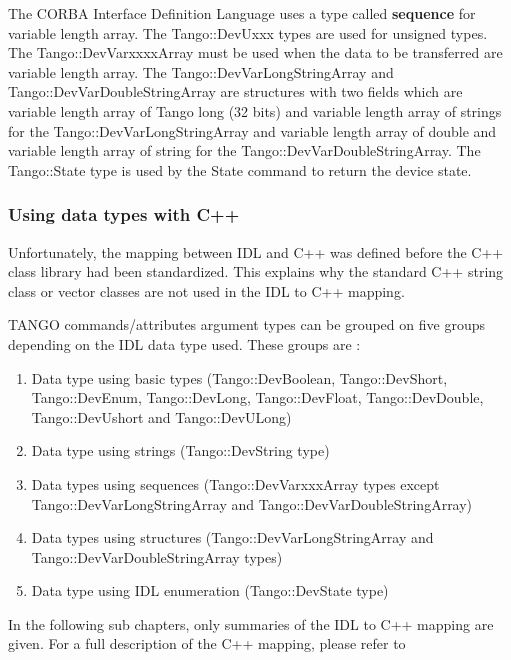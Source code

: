 \vspace{0.3cm}


The CORBA Interface Definition Language uses a type called \textbf{sequence}
for variable length array. The Tango::DevUxxx types are used for unsigned
types. The Tango::DevVarxxxxArray must be used when the data to be
transferred are variable length array. The Tango::DevVarLongStringArray
and Tango::DevVarDoubleStringArray
are structures with two fields which are variable length array of
Tango long (32 bits) and variable length array of strings for the
Tango::DevVarLongStringArray and variable length array of double and
variable length array of string for the Tango::DevVarDoubleStringArray.
The Tango::State type is used by the State
command to return the device state. 


\subsubsection{Using data types with C++}

Unfortunately, the mapping between IDL and C++ was defined before
the C++ class library had been standardized. This explains why the
standard C++ string class or vector classes are not used in the IDL
to C++ mapping.

TANGO commands/attributes argument types can be grouped on five groups
depending on the IDL data type used. These groups are :
\begin{enumerate}
\item Data type using basic types (Tango::DevBoolean, Tango::DevShort, Tango::DevEnum,
Tango::DevLong, Tango::DevFloat, Tango::DevDouble, Tango::DevUshort
and Tango::DevULong)
\item Data type using strings (Tango::DevString type)
\item Data types using sequences (Tango::DevVarxxxArray
types except Tango::DevVarLongStringArray and Tango::DevVarDoubleStringArray)
\item Data types using structures (Tango::DevVarLongStringArray and Tango::DevVarDoubleStringArray
types)
\item Data type using IDL enumeration (Tango::DevState type)
\end{enumerate}
In the following sub chapters, only summaries of the IDL to C++ mapping
are given. For a full description of the C++ mapping, please refer
to \cite{Henning}


